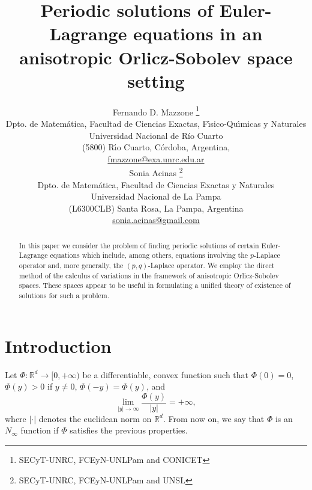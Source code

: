 \documentclass[twoside]{article}
\title{Periodic solutions of
Euler-Lagrange equations in an anisotropic Orlicz-Sobolev space setting  }
\author{
 Fernando D. Mazzone \thanks{SECyT-UNRC, FCEyN-UNLPam and CONICET}\\
Dpto. de Matem\'atica, Facultad de Ciencias Exactas, F\'{\i}sico-Qu\'{\i}micas y Naturales\\
Universidad Nacional de R\'{i}o Cuarto\\
(5800) R\'{\i}o Cuarto, C\'ordoba, Argentina,\\
\url{fmazzone@exa.unrc.edu.ar} \\
Sonia Acinas \thanks{SECyT-UNRC,  FCEyN-UNLPam and UNSL}\\
Dpto. de Matem\'atica, Facultad de Ciencias Exactas y Naturales\\
Universidad Nacional de La Pampa\\
(L6300CLB) Santa Rosa, La Pampa, Argentina\\
\url{sonia.acinas@gmail.com}\\[3mm]
}
\date{}
\theoremstyle{remark}
\newcommand{\rr}{\mathbb{R}}
\begin{document}
\maketitle
%
\begingroup%
    \renewcommand{\thefootnote}{}%
    \endgroup
%
%
%
%

\begin{abstract}
In this paper we consider the problem of finding periodic solutions of certain Euler-Lagrange equations which include, among others, equations involving the $p$-Laplace operator and, more generally, the $(p,q)$-Laplace operator. We employ the direct method of the calculus of variations in the framework of anisotropic Orlicz-Sobolev spaces. These spaces appear to be useful in formulating a unified theory of existence of solutions for such a problem.
\end{abstract}






\pagestyle{fancy} \headheight 35pt \fancyhead{} \fancyfoot{}

\fancyfoot[C]{\thepage}  \fancyhead[CO]{\nouppercase{\section}}

\fancyhead[CO]{\nouppercase{\leftmark}}






\section{Introduction}

Let $\Phi:\mathbb{R}^d\to [0,+\infty)$ be  a differentiable, convex function such that $\Phi(0)=0$, $\Phi(y)>0$ if $y\neq 0$, $\Phi(-y)=\Phi(y)$,
 and
\begin{equation}\label{eq:N-sub-inf}
\lim_{|y|\to\infty}\frac{\Phi(y)}{|y|}=+\infty,
\end{equation}
where $|\cdot|$ denotes the euclidean norm on $\rr^d$. From now on, we say that $\Phi$ is an $N_{\infty}$ function if $\Phi$ satisfies the previous properties.
\end{document}
